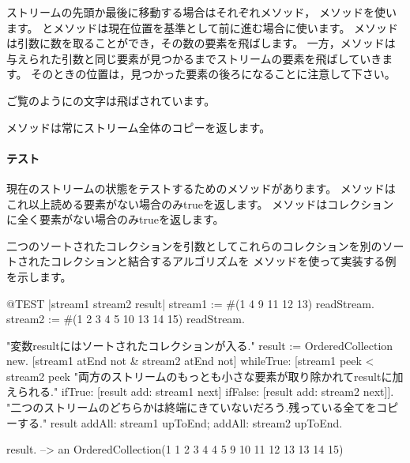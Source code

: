 \documentclass[a4paper,10pt,twoside]{book}
\begin{document}
ストリームの先頭か最後に移動する場合はそれぞれメソッド，
メソッドを使います。
とメソッドは現在位置を基準として前に進む場合に使います。
メソッドは引数に数を取ることができ，その数の要素を飛ばします。
一方，メソッドは与えられた引数と同じ要素が見つかるまでストリームの要素を飛ばしていきます。
そのときの位置は，見つかった要素の後ろになることに注意して下さい。


ご覧のようにの文字は飛ばされています。

メソッドは常にストリーム全体のコピーを返します。

\paragraph{テスト}現在のストリームの状態をテストするためのメソッドがあります。
メソッドはこれ以上読める要素がない場合のみtrueを返します。
メソッドはコレクションに全く要素がない場合のみtrueを返します。

二つのソートされたコレクションを引数としてこれらのコレクションを別のソートされたコレクションと結合するアルゴリズムを
メソッドを使って実装する例を示します。

\begin{code}{@TEST |stream1 stream2 result|}
stream1 := #(1 4 9 11 12 13) readStream.
stream2 := #(1 2 3 4 5 10 13 14 15) readStream.

"変数resultにはソートされたコレクションが入る."
result := OrderedCollection new.
[stream1 atEnd not & stream2 atEnd not]
  whileTrue: [stream1 peek < stream2 peek
    "両方のストリームのもっとも小さな要素が取り除かれてresultに加えられる."
    ifTrue: [result add: stream1 next]
    ifFalse: [result add: stream2 next]].
"二つのストリームのどちらかは終端にきていないだろう.残っている全てをコピーする."
result
  addAll: stream1 upToEnd;
  addAll: stream2 upToEnd.

result. -->   an OrderedCollection(1 1 2 3 4 4 5 9 10 11 12 13 13 14 15)
\end{code}
\end{document}
